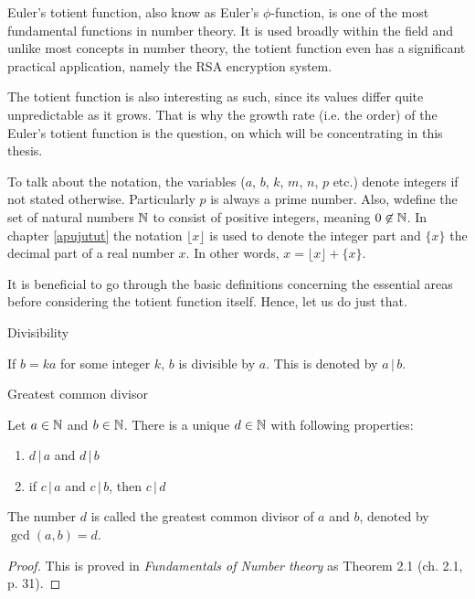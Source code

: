 \documentclass{article}
\begin{document}
Euler's totient function, also know as Euler's $\phi$-function, is one of the most fundamental functions in number theory. It is used broadly within the field and unlike most concepts in number theory, the totient function even has a significant practical application, namely the RSA encryption system.

The totient function is also interesting as such, since its values differ quite unpredictable as it grows. That is why the growth rate (i.e. the order) of the Euler's totient function is the question, on which will be concentrating in this thesis.

To talk about the notation, the variables ($a$, $b$, $k$, $m$, $n$, $p$ etc.) denote integers if not stated otherwise. Particularly $p$ is always a prime number. Also, wdefine the set of natural numbers $\mathbb{N}$ to consist of positive integers, meaning $0 \not\in \mathbb{N}$. In chapter \ref{apujutut} the notation $\lfloor x\rfloor$ is used to denote the integer part and $\{x\}$ the decimal part of a real number $x$. In other words, $x=\lfloor x\rfloor+\{x\}$.

It is beneficial to go through the basic definitions concerning the essential areas before considering the totient function itself. Hence, let us do just that.

\begin{definition}
Divisibility

If $b=ka$ for some integer $k$, $b$ is divisible by $a$. This is denoted by $a \,\vert\, b$.

\end{definition}

\begin{theorem}
Greatest common divisor

Let $a \in \mathbb{N}$ and $b \in \mathbb{N}$. There is a unique $d \in \mathbb{N}$ with following properties:

\begin{enumerate}
 \item $d \,\vert\, a$ and $d \,\vert\, b$
 \item if $c \,\vert\, a$ and $c \,\vert\, b$, then $c \,\vert\, d$
\end{enumerate}

The number $d$ is called the greatest common divisor of $a$ and $b$, denoted by $\gcd(a,b) = d$.

\begin{proof}
This is proved in \textit{Fundamentals of Number theory} \cite{LeVeque} as Theorem 2.1 (ch. 2.1, p. 31).
\end{proof}
\end{theorem}
\end{document}
